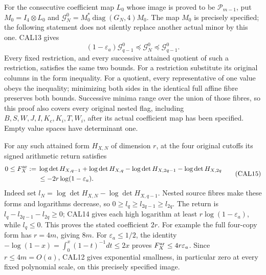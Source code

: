For the consecutive coefficient map $L_0$ whose image is proved
to be $\mathcal P_{m-1}$, put $M_0=I_4\otimes L_0$ and
$\mathcal G_N^0=M_0^*\operatorname{diag}(G_N,4)M_0$.
The map $M_0$ is precisely specified; the following statement does
not silently replace another actual minor by this one.
CAL13 gives
\[
 (1-\varepsilon_a)\mathcal G_{q-1}^0
       \preceq\mathcal G_N^0\preceq\mathcal G_{q-1}^0.
 \tag{CAL14}
\]
Every fixed restriction, and every successive attained quotient of
such a restriction, satisfies the same two bounds. For a restriction
substitute its original columns in the form inequality. For a
quotient, every representative of one value obeys the inequality;
minimizing both sides in the identical full affine fibre preserves
both bounds. Successive minima range over the union of those fibres,
so this proof also covers every original nested flag, including
$B,S,W,J,I,K_c,K_i,T,W_i$, after its actual coefficient map has
been specified. Empty value spaces have determinant one.

For any such attained form $H_{X,N}$ of dimension $r$, at the four
original cutoffs its signed arithmetic return satisfies
\[
 \begin{split}
 0\le F_X^{\rm ar}:={}&
 \log\det H_{X,q-1}+\log\det H_{X,q}
 -\log\det H_{X,2q-1}-\log\det H_{X,2q}\\
 &\le-2r\log(1-\varepsilon_a).
 \end{split}                                                     \tag{CAL15}
\]
Indeed set $l_N=\log\det H_{X,N}-\log\det H_{X,q-1}$.
Nested source fibres make these forms and logarithms decrease,
so $0\ge l_q\ge l_{2q-1}\ge l_{2q}$. The return is
$l_q-l_{2q-1}-l_{2q}\ge0$; CAL14 gives each high logarithm
at least $r\log(1-\varepsilon_a)$, while $l_q\le0$.
This proves the stated coefficient $2r$.
For example the full four-copy form has $r=4m$, giving $8m$.
For $\varepsilon_a\le1/2$, the identity
$-\log(1-x)=\int_0^x(1-t)^{-1}dt\le2x$ proves
$F_X^{\rm ar}\le4r\varepsilon_a$. Since $r\le4m=O(a)$,
CAL12 gives exponential smallness, in particular zero at every
fixed polynomial scale, on this precisely specified image.

